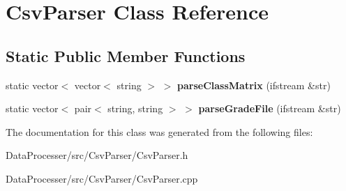 \hypertarget{classCsvParser}{}\section{Csv\+Parser Class Reference}
\label{classCsvParser}
\subsection*{Static Public Member Functions}
\begin{DoxyCompactItemize}
\item 
\mbox{\label{classCsvParser_a6f7c94b8d8cdeaf79f913ffc5571d884}} 
static vector$<$ vector$<$ string $>$ $>$ {\bfseries parse\+Class\+Matrix} (ifstream \&str)
\item 
\mbox{\label{classCsvParser_addbc1c755de70fa9e6366be186c43207}} 
static vector$<$ pair$<$ string, string $>$ $>$ {\bfseries parse\+Grade\+File} (ifstream \&str)
\end{DoxyCompactItemize}


The documentation for this class was generated from the following files\+:\begin{DoxyCompactItemize}
\item 
Data\+Processer/src/\+Csv\+Parser/Csv\+Parser.\+h\item 
Data\+Processer/src/\+Csv\+Parser/Csv\+Parser.\+cpp\end{DoxyCompactItemize}
